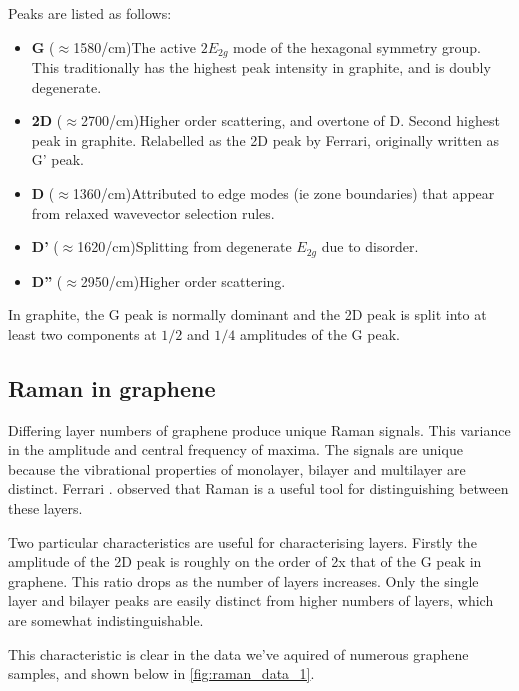 \documentclass[../Matt_Gebert_Honours_Thesis.tex]{subfiles}
\begin{document}
Peaks are listed as follows:
\begin{itemize}[noitemsep,topsep=0pt,leftmargin=0.4cm]
	\item \textbf{G} ($\approx$1580/cm)\hspace{0.2cm}The active $2E_{2g}$ mode of the hexagonal symmetry group. This traditionally has the highest peak intensity in graphite, and is doubly degenerate.
	\item \textbf{2D} ($\approx$2700/cm)\hspace{0.2cm}Higher order scattering, and overtone of D. Second highest peak in graphite. Relabelled as the 2D peak by Ferrari, originally written as G' peak.
	\item \textbf{D} ($\approx$1360/cm)\hspace{0.2cm}Attributed to edge modes (ie zone boundaries) that appear from relaxed wavevector selection rules.
	\item \textbf{D'} ($\approx$1620/cm)\hspace{0.2cm}Splitting from degenerate $E_{2g}$ due to disorder.
	\item \textbf{D''} ($\approx$2950/cm)\hspace{0.2cm}Higher order scattering.	
\end{itemize}

In graphite, the G peak is normally dominant and the 2D peak is split into at least two components at $1/2$ and $1/4$ amplitudes of the G peak. 

\subsection{Raman in graphene}
Differing layer numbers of graphene produce unique Raman signals\cite{ferrari_raman_2006,ferrari_raman_2013}. This variance in the amplitude and central frequency of maxima. The signals are unique because the vibrational properties of monolayer, bilayer and multilayer are distinct. Ferrari \etal{}. observed that Raman is a useful tool for distinguishing between these layers.

Two particular characteristics are useful for characterising layers. Firstly the amplitude of the 2D peak is roughly on the order of 2x that of the G peak in graphene. This ratio drops as the number of layers increases. Only the single layer and bilayer peaks are easily distinct from higher numbers of layers, which are somewhat indistinguishable.

This characteristic is clear in the data we've aquired of numerous graphene samples, and shown below in \cref{fig:raman_data_1}.
\end{document}
